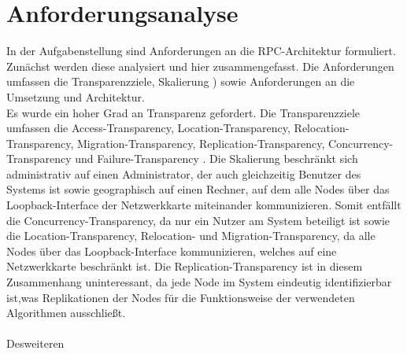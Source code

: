 %
\chapter{Anforderungsanalyse}

In der Aufgabenstellung sind Anforderungen an die RPC-Architektur formuliert.
Zunächst werden diese analysiert und hier zusammengefasst.
Die Anforderungen umfassen die Transparenzziele, Skalierung \cite{tanenbaumvansteen}) sowie Anforderungen
an die Umsetzung und Architektur.\\
Es wurde ein hoher Grad an Transparenz gefordert.
Die Transparenzziele umfassen die Access-Transparency, Location-Transparency, Relocation-Transparency,
Migration-Transparency, Replication-Transparency, Concurrency-Transparency und Failure-Transparency \citep{tanenbaumvansteen}.
Die Skalierung beschränkt sich administrativ auf einen Administrator, der auch gleichzeitig
Benutzer des Systems ist sowie geographisch auf einen Rechner, auf dem alle Nodes 
\citep{tanenbaumvansteen} über das Loopback-Interface der Netzwerkkarte miteinander kommunizieren.
Somit entfällt die Concurrency-Transparency, da nur ein Nutzer am System beteiligt ist sowie die
Location-Transparency, Relocation- und Migration-Transparency, da alle Nodes über das Loopback-Interface
kommunizieren, welches auf eine Netzwerkkarte beschränkt ist. Die Replication-Transparency ist in diesem Zusammenhang 
uninteressant, da jede Node im System eindeutig identifizierbar ist,was Replikationen der Nodes für die Funktionsweise 
der verwendeten Algorithmen ausschließt.\\\\
Desweiteren 
